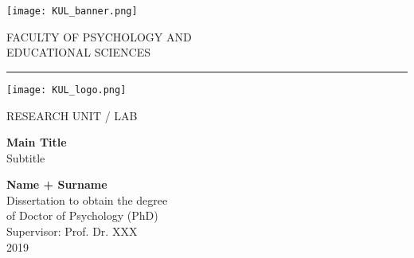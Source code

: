 \begin{titlepage}
	\noindent%
	\begin{minipage}[c][2cm][c]{0.15\textwidth}
		\texttt{[image: KUL\_banner.png]}%
	\end{minipage}%
	\begin{minipage}[c][2cm][c]{0.7\textwidth}
		\begin{flushright}
		 FACULTY OF PSYCHOLOGY AND\\
		 EDUCATIONAL SCIENCES
		\end{flushright}
	\end{minipage}%
	\hspace*{0.1cm}
	\begin{minipage}[c][2cm][c]{0.04\textwidth}
		\textcolor{vertbar}{\rule{0.2cm}{1.3cm}}
	\end{minipage}%
	\begin{minipage}[c][2cm][c]{0.08\textwidth}
		\texttt{[image: KUL\_logo.png]}
	\end{minipage}%
	

	\vspace*{0.8cm}
	\begin{flushright}
		RESEARCH UNIT / LAB
	\end{flushright}
	
	\vspace*{2.7cm}
	\begin{flushleft}
	\Huge
	\textcolor{title}{\textbf{Main Title\\}}
	\vspace{0.2cm}
	\LARGE
 	Subtitle
 	\end{flushleft}
 	
 	\vspace{3cm}
	\begin{flushright}
		\large
		\textbf{Name + Surname\\}
		\vspace{0.2cm}
		\normalsize
		Dissertation to obtain the degree\\ 
		of Doctor of Psychology (PhD)\\
		\vspace{0.3cm}
		Supervisor: Prof. Dr. XXX\\
		\vspace{1cm}
		2019		
	\end{flushright}	
\end{titlepage}
